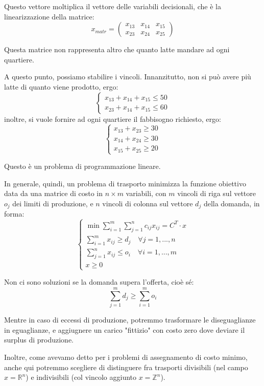 \documentclass[a4paper,11pt]{article}
\begin{document}
Questo vettore moltiplica il vettore delle variabili decisionali, che è la linearizzazione della matrice:
$$
x_{matr} =
\begin{pmatrix}
	x_{13} & x_{14} & x_{15} \\ 
	x_{23} & x_{24} & x_{25}
\end{pmatrix}
$$

Questa matrice non rappresenta altro che quanto latte mandare ad ogni quartiere.

A questo punto, possiamo stabilire i vincoli.
Innanzitutto, non si può avere più latte di quanto viene prodotto, ergo:
\[
	\begin{cases}
		x_{13} + x_{14} + x_{15} \leq 50 \\ 
		x_{23} + x_{14} + x_{15} \leq 60
	\end{cases}
\]
inoltre, si vuole fornire ad ogni quartiere il fabbisogno richiesto, ergo:
\[
	\begin{cases}
		x_13 + x_{23} \geq 30 \\	
		x_14 + x_{24} \geq 30	\\
		x_15 + x_{25} \geq 20	
	\end{cases}
\]

Questo è un problema di programmazione lineare.

In generale, quindi, un problema di trasporto minimizza la funzione obiettivo data da una matrice di costo in $n \times m$ variabili, con $m$ vincoli di riga sul vettore $o_j$ dei limiti di produzione, e $n$ vincoli di colonna sul vettore $d_j$ della domanda, in forma:
\[
	\begin{cases}
		\min{\sum^m_{i=1} \sum^n_{j=1} c_{ij}x_{ij}} = C^T \cdot x \\
		\sum^m_{i=1} x_{ij} \geq d_{j} \quad \forall j = 1,...,n \\ 
		\sum^n_{j=1} x_{ij} \leq o_{i} \quad \forall i = 1,...,m \\ 
		x \geq 0
	\end{cases}
\]

Non ci sono soluzioni se la domanda supera l'offerta, cioè sé:
$$
\sum_{j=1}^m d_j \geq \sum_{i=1}^m o_i
$$

Mentre in caso di eccessi di produzione, potremmo trasformare le diseguaglianze in eguaglianze, e aggiugnere un carico "fittizio" con costo zero dove deviare il surplus di produzione.

Inoltre, come avevamo detto per i problemi di assegnamento di costo minimo, anche qui potremmo scegliere di distinguere fra trasporti divisibili (nel campo $x = \mathbb{R}^n$) e indivisibili (col vincolo aggiunto $x = \mathbb{Z}^n$).
\end{document}
